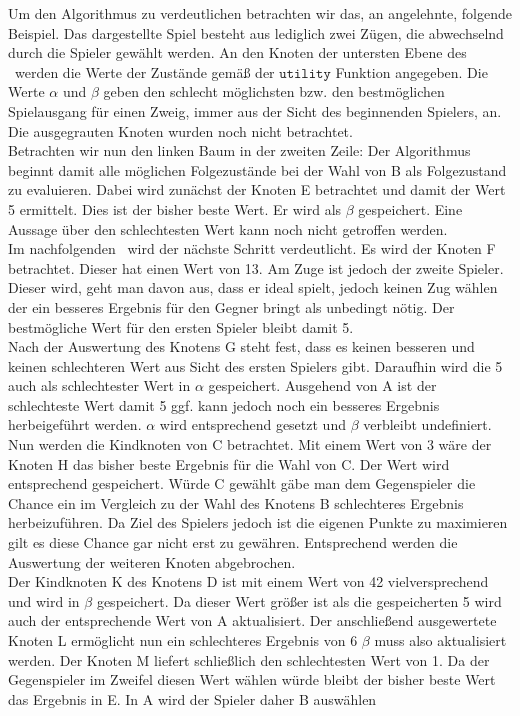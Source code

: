 Um den Algorithmus zu verdeutlichen betrachten wir das, an \cite{Russell.2016} angelehnte, folgende Beispiel. Das dargestellte Spiel besteht aus lediglich zwei Zügen, die abwechselnd durch die Spieler gewählt werden. An den Knoten der untersten Ebene des \gtree\ werden die Werte der Zustände gemäß der $\mathtt{utility}$ Funktion angegeben. Die Werte $\alpha$ und $\beta$ geben den schlecht möglichsten bzw. den bestmöglichen Spielausgang für einen Zweig, immer aus der Sicht des beginnenden Spielers, an. Die ausgegrauten Knoten wurden noch nicht betrachtet.\\
Betrachten wir nun den linken Baum in der zweiten Zeile: Der Algorithmus beginnt damit alle möglichen Folgezustände bei der Wahl von B als Folgezustand zu evaluieren. Dabei wird zunächst der Knoten E betrachtet und damit der Wert 5 ermittelt. Dies ist der bisher beste Wert. Er wird als $\beta$ gespeichert. Eine Aussage über den schlechtesten Wert kann noch nicht getroffen werden.\\
Im nachfolgenden \gtree\ wird der nächste Schritt verdeutlicht. Es wird der Knoten F betrachtet. Dieser hat einen Wert von 13. Am Zuge ist jedoch der zweite Spieler. Dieser wird, geht man davon aus, dass er ideal spielt, jedoch keinen Zug wählen der ein besseres Ergebnis für den Gegner bringt als unbedingt nötig. Der bestmögliche Wert für den ersten Spieler bleibt damit 5.\\
Nach der Auswertung des Knotens G steht fest, dass es keinen besseren und keinen schlechteren Wert aus Sicht des ersten Spielers gibt. Daraufhin wird die 5 auch als schlechtester Wert in $\alpha$ gespeichert. Ausgehend von A  ist der schlechteste Wert damit 5 ggf. kann jedoch noch ein besseres Ergebnis herbeigeführt werden. $\alpha$ wird entsprechend gesetzt und $\beta$ verbleibt undefiniert.\\
Nun werden die Kindknoten von C betrachtet. Mit einem Wert von 3 wäre der Knoten H das bisher beste Ergebnis für die Wahl von C. Der Wert wird entsprechend gespeichert. Würde C gewählt gäbe man dem Gegenspieler die Chance ein im Vergleich zu der Wahl des Knotens B schlechteres Ergebnis herbeizuführen. Da Ziel des Spielers jedoch ist die eigenen Punkte zu maximieren gilt es diese Chance gar nicht erst zu gewähren. Entsprechend werden die Auswertung der weiteren Knoten abgebrochen.\\
Der Kindknoten K des Knotens D ist mit einem Wert von 42 vielversprechend und wird in $\beta$ gespeichert. Da dieser Wert größer ist als die gespeicherten 5 wird auch der entsprechende Wert von A aktualisiert. Der anschließend ausgewertete Knoten L ermöglicht nun ein schlechteres Ergebnis von 6 $\beta$ muss also aktualisiert werden. Der Knoten M liefert schließlich den schlechtesten Wert von 1. Da der Gegenspieler im Zweifel diesen Wert wählen würde bleibt der bisher beste Wert das Ergebnis in E. In A wird der Spieler daher B auswählen
